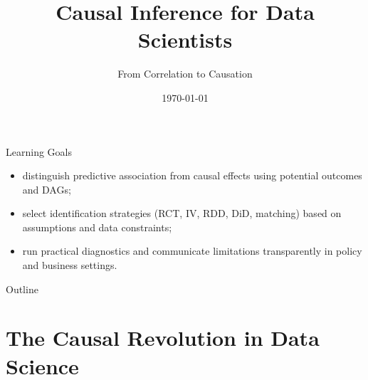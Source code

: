 \documentclass[aspectratio=169,11pt]{beamer}
\title[Causal Inference]{Causal Inference for Data Scientists}
\subtitle{From Correlation to Causation}
\date{\today}
\begin{document}
\begin{frame}
\titlepage
\end{frame}

\begin{frame}{Learning Goals}
\begin{itemize}
\item distinguish predictive association from causal effects using potential outcomes and DAGs;
\item select identification strategies (RCT, IV, RDD, DiD, matching) based on assumptions and data constraints;
\item run practical diagnostics and communicate limitations transparently in policy and business settings.
\end{itemize}
\end{frame}

\begin{frame}{Outline}
\tableofcontents
\end{frame}

\section{The Causal Revolution in Data Science}
\end{document}
